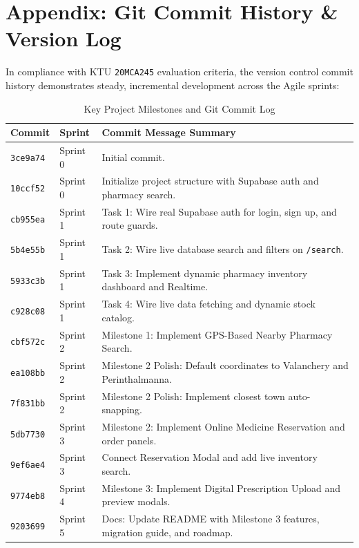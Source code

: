 \documentclass[12pt,a4paper]{report}
\begin{document}
\chapter*{Appendix: Git Commit History \& Version Log}

In compliance with KTU \texttt{20MCA245} evaluation criteria, the version control commit history demonstrates steady, incremental development across the Agile sprints:

\begin{table}[htbp]
\centering
\caption{Key Project Milestones and Git Commit Log}
\begin{tabular}{p{2.0cm}p{2.2cm}p{10.5cm}}
\toprule
\textbf{Commit} & \textbf{Sprint} & \textbf{Commit Message Summary} \\
\midrule
\texttt{3ce9a74} & Sprint 0 & Initial commit. \\
\texttt{10ccf52} & Sprint 0 & Initialize project structure with Supabase auth and pharmacy search. \\
\texttt{cb955ea} & Sprint 1 & Task 1: Wire real Supabase auth for login, sign up, and route guards. \\
\texttt{5b4e55b} & Sprint 1 & Task 2: Wire live database search and filters on \texttt{/search}. \\
\texttt{5933c3b} & Sprint 1 & Task 3: Implement dynamic pharmacy inventory dashboard and Realtime. \\
\texttt{c928c08} & Sprint 1 & Task 4: Wire live data fetching and dynamic stock catalog. \\
\texttt{cbf572c} & Sprint 2 & Milestone 1: Implement GPS-Based Nearby Pharmacy Search. \\
\texttt{ea108bb} & Sprint 2 & Milestone 2 Polish: Default coordinates to Valanchery and Perinthalmanna. \\
\texttt{7f831bb} & Sprint 2 & Milestone 2 Polish: Implement closest town auto-snapping. \\
\texttt{5db7730} & Sprint 3 & Milestone 2: Implement Online Medicine Reservation and order panels. \\
\texttt{9ef6ae4} & Sprint 3 & Connect Reservation Modal and add live inventory search. \\
\texttt{9774eb8} & Sprint 4 & Milestone 3: Implement Digital Prescription Upload and preview modals. \\
\texttt{9203699} & Sprint 5 & Docs: Update README with Milestone 3 features, migration guide, and roadmap. \\
\bottomrule
\end{tabular}
\end{table}
\end{document}
